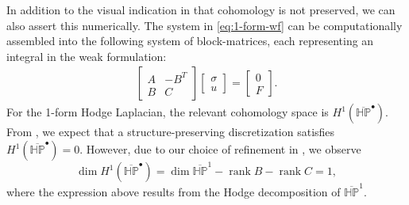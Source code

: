 \documentclass[10pt]{article}
\DeclareMathOperator{\rank}{rank}
\newcommand{\vSpace}[1]{\mathbb{#1}}
\newcommand{\complex}[1]{\mathit{\vSpace{#1}^\bullet}}
\newcommand{\polar}{P}
\newcommand{\hSpace}[1]{\mathit{\vSpace{H}\vSpace{#1}}}
\theoremstyle{plain}
\theoremstyle{definition}
\theoremstyle{remark}
\begin{document}
In addition to the visual indication in 
that cohomology is not preserved, we can also assert this numerically.
The system in \eqref{eq:1-form-wf} can be computationally assembled into the following
system of block-matrices, each representing an integral in the weak formulation:
\begin{align*}
    \begin{bmatrix*}
        A & -B^T \\
        B & C
    \end{bmatrix*}
    \begin{bmatrix*}
        \sigma \\
        u
    \end{bmatrix*}
    =
    \begin{bmatrix}
        0 \\
        F
    \end{bmatrix}.
\end{align*}
For the 1-form Hodge Laplacian, the relevant cohomology space is
\(H^1(\complex{\overline{H\polar}})\).
From , we expect that a structure-preserving discretization satisfies
$H^1(\complex{\overline{H\polar}}) = 0$. However, due to our choice of refinement in , we observe
\[
    \dim H^1(\complex{\overline{H\polar}}) = \dim \overline{\hSpace{\polar}}^1 - \rank B -
    \rank C = 1,
\]
where the expression above results from the Hodge decomposition of
\(\overline{\hSpace{\polar}}^1\).
\end{document}
